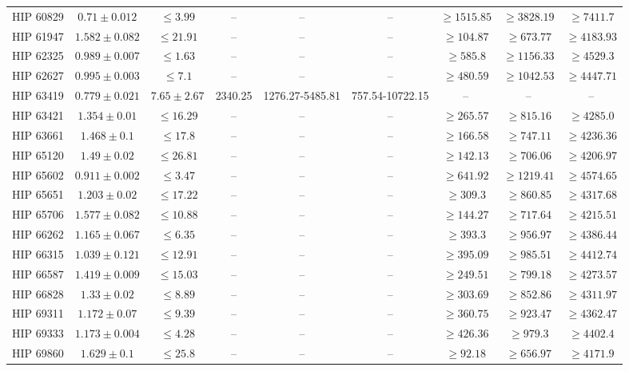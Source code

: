 {\begin{longtable}{|c|c|c|c|c|c|c|c|c|}
HIP 60829 & $ 0.71 \pm 0.012 $ & $\le 3.99 $ &-- &-- &-- & $\ge 1515.85 $ & $\ge 3828.19 $ & $\ge 7411.7 $ \\
HIP 61947 & $ 1.582 \pm 0.082 $ & $\le 21.91 $ &-- &-- &-- & $\ge 104.87 $ & $\ge 673.77 $ & $\ge 4183.93 $ \\
HIP 62325 & $ 0.989 \pm 0.007 $ & $\le 1.63 $ &-- &-- &-- & $\ge 585.8 $ & $\ge 1156.33 $ & $\ge 4529.3 $ \\
HIP 62627 & $ 0.995 \pm 0.003 $ & $\le 7.1 $ &-- &-- &-- & $\ge 480.59 $ & $\ge 1042.53 $ & $\ge 4447.71 $ \\
HIP 63419 & $ 0.779 \pm 0.021 $ & $ 7.65 \pm 2.67 $ & 2340.25 & 1276.27-5485.81 & 757.54-10722.15 &-- &-- &-- \\
HIP 63421 & $ 1.354 \pm 0.01 $ & $\le 16.29 $ &-- &-- &-- & $\ge 265.57 $ & $\ge 815.16 $ & $\ge 4285.0 $ \\
HIP 63661 & $ 1.468 \pm 0.1 $ & $\le 17.8 $ &-- &-- &-- & $\ge 166.58 $ & $\ge 747.11 $ & $\ge 4236.36 $ \\
HIP 65120 & $ 1.49 \pm 0.02 $ & $\le 26.81 $ &-- &-- &-- & $\ge 142.13 $ & $\ge 706.06 $ & $\ge 4206.97 $ \\
HIP 65602 & $ 0.911 \pm 0.002 $ & $\le 3.47 $ &-- &-- &-- & $\ge 641.92 $ & $\ge 1219.41 $ & $\ge 4574.65 $ \\
HIP 65651 & $ 1.203 \pm 0.02 $ & $\le 17.22 $ &-- &-- &-- & $\ge 309.3 $ & $\ge 860.85 $ & $\ge 4317.68 $ \\
HIP 65706 & $ 1.577 \pm 0.082 $ & $\le 10.88 $ &-- &-- &-- & $\ge 144.27 $ & $\ge 717.64 $ & $\ge 4215.51 $ \\
HIP 66262 & $ 1.165 \pm 0.067 $ & $\le 6.35 $ &-- &-- &-- & $\ge 393.3 $ & $\ge 956.97 $ & $\ge 4386.44 $ \\
HIP 66315 & $ 1.039 \pm 0.121 $ & $\le 12.91 $ &-- &-- &-- & $\ge 395.09 $ & $\ge 985.51 $ & $\ge 4412.74 $ \\
HIP 66587 & $ 1.419 \pm 0.009 $ & $\le 15.03 $ &-- &-- &-- & $\ge 249.51 $ & $\ge 799.18 $ & $\ge 4273.57 $ \\
HIP 66828 & $ 1.33 \pm 0.02 $ & $\le 8.89 $ &-- &-- &-- & $\ge 303.69 $ & $\ge 852.86 $ & $\ge 4311.97 $ \\
HIP 69311 & $ 1.172 \pm 0.07 $ & $\le 9.39 $ &-- &-- &-- & $\ge 360.75 $ & $\ge 923.47 $ & $\ge 4362.47 $ \\
HIP 69333 & $ 1.173 \pm 0.004 $ & $\le 4.28 $ &-- &-- &-- & $\ge 426.36 $ & $\ge 979.3 $ & $\ge 4402.4 $ \\
HIP 69860 & $ 1.629 \pm 0.1 $ & $\le 25.8 $ &-- &-- &-- & $\ge 92.18 $ & $\ge 656.97 $ & $\ge 4171.9 $ \\

\end{longtable}}
